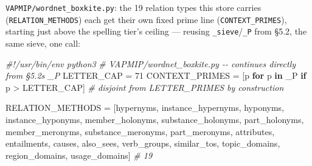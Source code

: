 \documentclass[
  10pt,
]{article}
\newenvironment{Shaded}{}{}
\newcommand{\CommentTok}[1]{\textcolor[rgb]{0.38,0.63,0.69}{\textit{#1}}}
\newcommand{\ControlFlowTok}[1]{\textcolor[rgb]{0.00,0.44,0.13}{\textbf{#1}}}
\newcommand{\DecValTok}[1]{\textcolor[rgb]{0.25,0.63,0.44}{#1}}
\newcommand{\KeywordTok}[1]{\textcolor[rgb]{0.00,0.44,0.13}{\textbf{#1}}}
\newcommand{\NormalTok}[1]{#1}
\newcommand{\OperatorTok}[1]{\textcolor[rgb]{0.40,0.40,0.40}{#1}}
\newcommand{\StringTok}[1]{\textcolor[rgb]{0.25,0.44,0.63}{#1}}
\begin{document}
\texttt{VAPMIP/wordnet\_boxkite.py}: the 19 relation types this store
carries (\texttt{RELATION\_METHODS}) each get their own fixed prime line
(\texttt{CONTEXT\_PRIMES}), starting just above the spelling tier's
ceiling --- reusing \texttt{\_sieve}/\texttt{\_P} from §5.2, the same
sieve, one call:

\begin{Shaded}
\begin{Highlighting}[]
\CommentTok{\#!/usr/bin/env python3}
\CommentTok{\# VAPMIP/wordnet\_boxkite.py {-}{-} continues directly from §5.2\textquotesingle{}s \_P}
\NormalTok{LETTER\_CAP }\OperatorTok{=} \DecValTok{71}
\NormalTok{CONTEXT\_PRIMES }\OperatorTok{=}\NormalTok{ [p }\ControlFlowTok{for}\NormalTok{ p }\KeywordTok{in}\NormalTok{ \_P }\ControlFlowTok{if}\NormalTok{ p }\OperatorTok{\textgreater{}}\NormalTok{ LETTER\_CAP]   }\CommentTok{\# disjoint from LETTER\_PRIMES by construction}

\NormalTok{RELATION\_METHODS }\OperatorTok{=}\NormalTok{ [}\StringTok{\textquotesingle{}hypernyms\textquotesingle{}}\NormalTok{, }\StringTok{\textquotesingle{}instance\_hypernyms\textquotesingle{}}\NormalTok{, }\StringTok{\textquotesingle{}hyponyms\textquotesingle{}}\NormalTok{,}
    \StringTok{\textquotesingle{}instance\_hyponyms\textquotesingle{}}\NormalTok{, }\StringTok{\textquotesingle{}member\_holonyms\textquotesingle{}}\NormalTok{, }\StringTok{\textquotesingle{}substance\_holonyms\textquotesingle{}}\NormalTok{,}
    \StringTok{\textquotesingle{}part\_holonyms\textquotesingle{}}\NormalTok{, }\StringTok{\textquotesingle{}member\_meronyms\textquotesingle{}}\NormalTok{, }\StringTok{\textquotesingle{}substance\_meronyms\textquotesingle{}}\NormalTok{,}
    \StringTok{\textquotesingle{}part\_meronyms\textquotesingle{}}\NormalTok{, }\StringTok{\textquotesingle{}attributes\textquotesingle{}}\NormalTok{, }\StringTok{\textquotesingle{}entailments\textquotesingle{}}\NormalTok{, }\StringTok{\textquotesingle{}causes\textquotesingle{}}\NormalTok{, }\StringTok{\textquotesingle{}also\_sees\textquotesingle{}}\NormalTok{,}
    \StringTok{\textquotesingle{}verb\_groups\textquotesingle{}}\NormalTok{, }\StringTok{\textquotesingle{}similar\_tos\textquotesingle{}}\NormalTok{, }\StringTok{\textquotesingle{}topic\_domains\textquotesingle{}}\NormalTok{, }\StringTok{\textquotesingle{}region\_domains\textquotesingle{}}\NormalTok{,}
    \StringTok{\textquotesingle{}usage\_domains\textquotesingle{}}\NormalTok{]                                            }\CommentTok{\# 19}


\end{Highlighting}
\end{Shaded}
\end{document}
